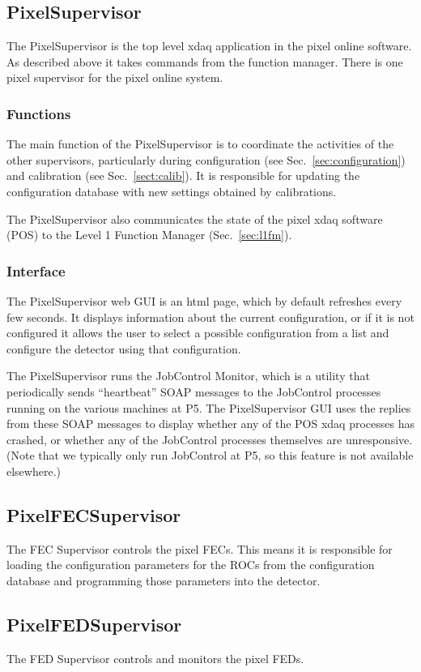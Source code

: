 \subsection{PixelSupervisor}

The PixelSupervisor is the top level xdaq application
in the pixel online software. As described above it takes
commands from the function manager. There is one pixel
supervisor for the pixel online system.

\subsubsection{Functions}

The main function of the PixelSupervisor is to coordinate the
activities of the other supervisors, particularly during configuration
(see Sec.~\ref{sec:configuration}) and calibration (see
Sec.~\ref{sect:calib}). It is responsible for updating the
configuration database with new settings obtained by calibrations.

The PixelSupervisor also communicates the state of the pixel
xdaq software (POS) to the Level 1 Function Manager (Sec.~\ref{sec:l1fm}).

\subsubsection{Interface}
The PixelSupervisor web GUI is an html page, which by default
refreshes every few seconds. It displays information about the current
configuration, or if it is not configured it allows the user to select
a possible configuration from a list and configure the detector using
that configuration.

The PixelSupervisor runs the JobControl Monitor, which is a utility
that periodically sends ``heartbeat'' SOAP messages to the JobControl
processes running on the various machines at P5. The PixelSupervisor
GUI uses the replies from these SOAP messages to display whether any of
the POS xdaq processes has crashed, or whether any of the JobControl
processes themselves are unresponsive. (Note that we typically only
run JobControl at P5, so this feature is not available elsewhere.)

\subsection{PixelFECSupervisor}

The FEC Supervisor controls the pixel FECs. This means it is
responsible for loading the configuration parameters for the ROCs from
the configuration database and programming those parameters into the
detector.

\subsection{PixelFEDSupervisor}

The FED Supervisor controls and monitors the pixel FEDs.




